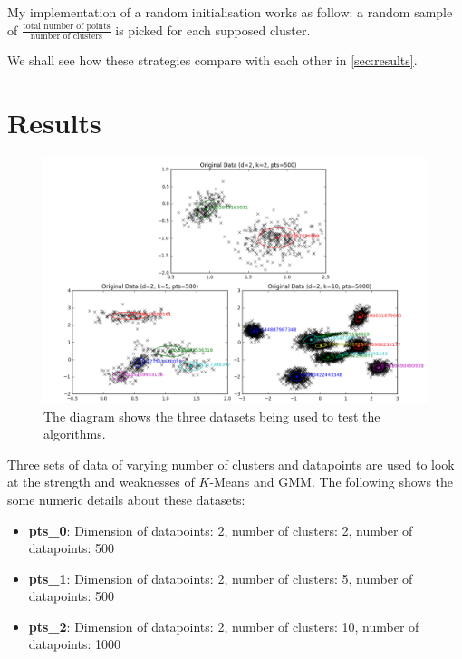 \documentclass[11pt,openright,a4paper]{article}
\numberwithin{equation}{section}
\begin{document}
My implementation of a random initialisation works as follow: a random sample of $\frac{\text{total number of points}}{\text{number of clusters}}$ is picked for each supposed cluster. 


We shall see how these strategies compare with each other in \autoref{sec:results}.


\section{Results} \label{sec:results}

\begin{figure}[H]
  \centering
  \includegraphics[width=1\textwidth]{screen-ori-data}
    \caption{The diagram shows the three datasets being used to test the algorithms.}
  \label{fig:screen-ori-data}
\end{figure} 

Three sets of data of varying number of clusters and datapoints are used to look at the strength and weaknesses of $K$-Means and GMM. The following shows the some numeric details about these datasets:
\begin{itemize}
    \item \textbf{pts\_0}: Dimension of datapoints: 2, number of clusters: 2, number of datapoints: 500
    \item \textbf{pts\_1}: Dimension of datapoints: 2, number of clusters: 5, number of datapoints: 500
    \item \textbf{pts\_2}: Dimension of datapoints: 2, number of clusters: 10, number of datapoints: 1000
\end{itemize}
\end{document}
